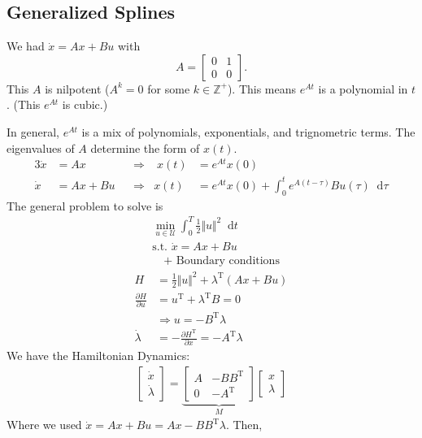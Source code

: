 \documentclass[letterpaper,12pt,titlepage]{report}
\newcommand*\dif{\mathop{}\!\mathrm{d}}
\newcommand{\trans}{^\text{T}}
\newcommand*\pder[2]{\frac{\partial #1}{\partial #2}}
\theoremstyle{plain}
\theoremstyle{definition}
\begin{document}
\subsection{Generalized Splines}
We had $\dot x=Ax+Bu$ with
\[ A = \begin{bmatrix}
    0 & 1 \\ 0 & 0
  \end{bmatrix}. \]
This $A$ is nilpotent ($A^k=0$ for some $k\in\mathbb Z^+$). This means $e^{At}$ is a polynomial in $t$. (This $e^{At}$ is cubic.)

In general, $e^{At}$ is a mix of polynomials, exponentials, and trignometric terms. The eigenvalues of $A$ determine the form of $x(t)$.
\begin{alignat}{3}
  \dot x &= Ax && \Longrightarrow & \; x(t) &= e^{At} x(0) \\
  \dot x &= Ax + Bu && \Longrightarrow & x(t) &= e^{At} x(0) + \int_0^t e^{A(t-\tau)} Bu(\tau) \dif\tau
\end{alignat}
The general problem to solve is
\begin{align}
  & \min_{u\in\mathcal U} \int_0^T \frac{1}{2} \Vert u\Vert^2 \dif t \\
  & \text{s.t. } \dot x = Ax + Bu \\
  & \quad \text{+ Boundary conditions}
\end{align}
\begin{align}
  H &= \frac{1}{2} \Vert u\Vert^2 + \lambda\trans (Ax+Bu) \\
  \pder{H}{u} &= u\trans + \lambda\trans B = 0 \\
    & \Rightarrow u = -B\trans\lambda \\
  \dot\lambda &= -\pder{H\trans}{x} = -A\trans\lambda
\end{align}
We have the Hamiltonian Dynamics:
\begin{gather}
  \begin{bmatrix}
    \dot x \\ \dot\lambda
  \end{bmatrix} =
  \underbrace{
    \begin{bmatrix}
      A & -BB\trans \\
      0 & -A\trans
    \end{bmatrix}
  }_{M}
  \begin{bmatrix}
    x \\ \lambda
  \end{bmatrix}
\end{gather}
Where we used $\dot x=Ax+Bu=Ax-BB\trans\lambda$. Then,
\end{document}
